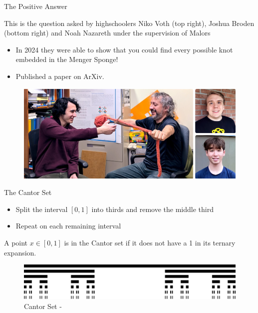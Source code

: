 \begin{frame}{The Positive Answer}
\begin{center}
    This is the question asked by highschoolers Niko Voth (top right), Joshua Broden (bottom right) and Noah Nazareth under the supervision of Malors
\end{center}
\begin{itemize}
    \item In 2024 they were able to show that you could find every possible knot embedded in the Menger Sponge!
    \item Published a paper on ArXiv.    
\end{itemize}
 \begin{figure}
     \centering
     \includegraphics[width=0.5\linewidth]{PhotoOfAuthors.png}
     \caption{\cite{Quanta}}
     \label{fig:enter-label}
 \end{figure}
\end{frame}

\begin{frame}{The Cantor Set}
\begin{itemize}
    \item Split the interval $[0,1]$ into thirds and remove the middle third
    \item Repeat on each remaining interval
\end{itemize}
\begin{remark}
    A point $x \in [0,1]$ is in the Cantor set if it does not have a 1 in its ternary expansion.
\end{remark}
\begin{figure}
    \centering
    \includegraphics[width=0.5\linewidth]{Cantor_set_in_seven_iterations.svg.png}
    \caption{Cantor Set - \cite{cantor}}
    \label{fig:enter-label}
\end{figure}
\end{frame}


